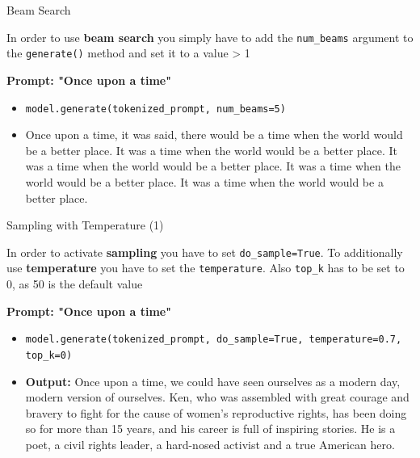 \documentclass[11pt,compress,t,notes=noshow, xcolor=table]{beamer}
\begin{document}

\begin{vbframe}{Beam Search}

\vfill

In order to use \textbf{beam search} you simply have to add the \texttt{num\_beams} argument to the \texttt{generate()} method and set it to a value > 1

\textbf{Prompt: "Once upon a time"}

\begin{itemize}
    \item \texttt{model.generate(tokenized\_prompt, num\_beams=5)}
    \item Once upon a time, it was said, there would be a time when the world would be a better place.
    It was a time when the world would be a better place.
    It was a time when the world would be a better place.
    It was a time when the world would be a better place.
    It was a time when the world would be a better place.
\end{itemize}

\vfill
    
\end{vbframe}



\begin{vbframe}{Sampling with Temperature (1)}

\vfill

In order to activate \textbf{sampling} you have to set \texttt{do\_sample=True}. To additionally use \textbf{temperature} you have to set the \texttt{temperature}. Also \texttt{top\_k} has to be set to 0, as 50 is the default value

\textbf{Prompt: "Once upon a time"}

\begin{itemize}
    \item \texttt{model.generate(tokenized\_prompt, do\_sample=True, temperature=0.7, top\_k=0)}
    \item \textbf{Output:} Once upon a time, we could have seen ourselves as a modern day, modern version of ourselves. Ken, who was assembled with great courage and bravery to fight for the cause of women's reproductive rights, has been doing so for more than 15 years, and his career is full of inspiring stories. He is a poet, a civil rights leader, a hard-nosed activist and a true American hero.
\end{itemize}

\vfill

\end{vbframe}
\end{document}
